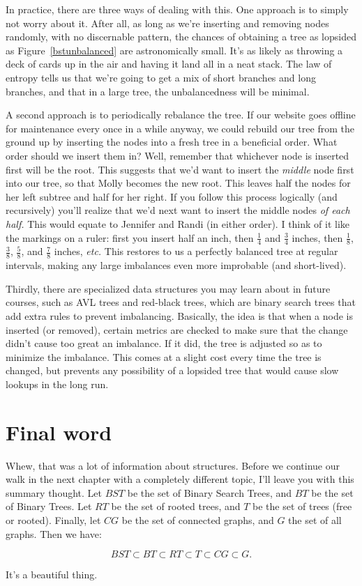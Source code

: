 In practice, there are three ways of dealing with this. One approach is to
simply not worry about it. After all, as long as we're inserting and
removing nodes randomly, with no discernable pattern, the chances of
obtaining a tree as lopsided as Figure~\ref{bstunbalanced} are
astronomically small. It's as likely as throwing a deck of cards up in the
air and having it land all in a neat stack. The law of entropy tells us
that we're going to get a mix of short branches and long branches, and that
in a large tree, the unbalancedness will be minimal.

A second approach is to periodically rebalance the tree. If our website
goes offline for maintenance every once in a while anyway, we could rebuild
our tree from the ground up by inserting the nodes into a fresh tree in a
beneficial order. What order should we insert them in? Well, remember that
whichever node is inserted first will be the root. This suggests that we'd
want to insert the \textit{middle} node first into our tree, so that Molly
becomes the new root. This leaves half the nodes for her left subtree and
half for her right. If you follow this process logically (and recursively)
you'll realize that we'd next want to insert the middle nodes \textit{of
each half.} This would equate to Jennifer and Randi (in either order). I
think of it like the markings on a ruler: first you insert half an inch,
then $\frac{1}{4}$ and $\frac{3}{4}$ inches, then $\frac{1}{8}$,
$\frac{3}{8}$, $\frac{5}{8}$, and $\frac{7}{8}$ inches, \textit{etc.} This
restores to us a perfectly balanced tree at regular intervals, making any
large imbalances even more improbable (and short-lived).

Thirdly, there are specialized data structures you may learn about in
future courses, such as AVL trees and red-black trees, which are binary
search trees that add extra rules to prevent imbalancing. Basically, the
idea is that when a node is inserted (or removed), certain metrics are
checked to make sure that the change didn't cause too great an imbalance.
If it did, the tree is adjusted so as to minimize the imbalance. This comes
at a slight cost every time the tree is changed, but prevents any
possibility of a lopsided tree that would cause slow lookups in the long
run.

\section{Final word}

Whew, that was a lot of information about structures. Before we continue
our walk in the next chapter with a completely different topic, I'll leave
you with this summary thought. Let $BST$ be the set of Binary Search Trees,
and $BT$ be the set of Binary Trees. Let $RT$ be the set of rooted trees,
and $T$ be the set of trees (free or rooted). Finally, let $CG$ be the set
of connected graphs, and $G$ the set of all graphs. Then we have:

\[
BST \subset BT \subset RT \subset T \subset CG \subset G.
\]

It's a beautiful thing.
